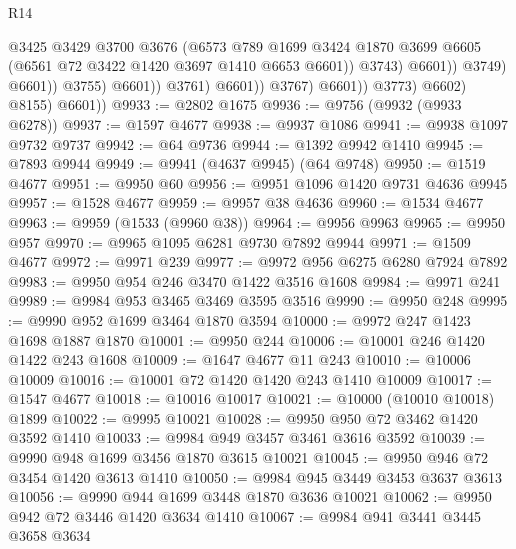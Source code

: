 \begin{lexlean}{R14}
\begin{coremodule}
                                            @3425
                                            @3429
                                            @3700
                                            @3676
                                            (@6573
                                              @789
                                              @1699
                                              @3424
                                              @1870
                                              @3699
                                              @6605
                                              (@6561 @72 @3422 @1420 @3697 @1410 @6653 @6601))
                                            @3743)
                                          @6601))
                                      @3749)
                                    @6601))
                                @3755)
                              @6601))
                          @3761)
                        @6601))
                    @3767)
                  @6601))
              @3773)
            @6602)
          @8155)
        @6601))
@9933 := @2802 @1675
@9936 := @9756 (@9932 (@9933 @6278))
@9937 := @1597 @4677
@9938 := @9937 @1086
@9941 := @9938 @1097 @9732 @9737
@9942 := @64 @9736
@9944 := @1392 @9942 @1410
@9945 := @7893 @9944
@9949 := @9941 (@4637 @9945) (@64 @9748)
@9950 := @1519 @4677
@9951 := @9950 @60
@9956 := @9951 @1096 @1420 @9731 @4636 @9945
@9957 := @1528 @4677
@9959 := @9957 @38 @4636
@9960 := @1534 @4677
@9963 := @9959 (@1533 (@9960 @38))
@9964 := @9956 @9963
@9965 := @9950 @957
@9970 := @9965 @1095 @6281 @9730 @7892 @9944
@9971 := @1509 @4677
@9972 := @9971 @239
@9977 := @9972 @956 @6275 @6280 @7924 @7892
@9983 := @9950 @954 @246 @3470 @1422 @3516 @1608
@9984 := @9971 @241
@9989 := @9984 @953 @3465 @3469 @3595 @3516
@9990 := @9950 @248
@9995 := @9990 @952 @1699 @3464 @1870 @3594
@10000 := @9972 @247 @1423 @1698 @1887 @1870
@10001 := @9950 @244
@10006 := @10001 @246 @1420 @1422 @243 @1608
@10009 := @1647 @4677 @11 @243
@10010 := @10006 @10009
@10016 := @10001 @72 @1420 @1420 @243 @1410 @10009
@10017 := @1547 @4677
@10018 := @10016 @10017
@10021 := @10000 (@10010 @10018) @1899
@10022 := @9995 @10021
@10028 := @9950 @950 @72 @3462 @1420 @3592 @1410
@10033 := @9984 @949 @3457 @3461 @3616 @3592
@10039 := @9990 @948 @1699 @3456 @1870 @3615 @10021
@10045 := @9950 @946 @72 @3454 @1420 @3613 @1410
@10050 := @9984 @945 @3449 @3453 @3637 @3613
@10056 := @9990 @944 @1699 @3448 @1870 @3636 @10021
@10062 := @9950 @942 @72 @3446 @1420 @3634 @1410
@10067 := @9984 @941 @3441 @3445 @3658 @3634

\end{coremodule}
\end{lexlean}
